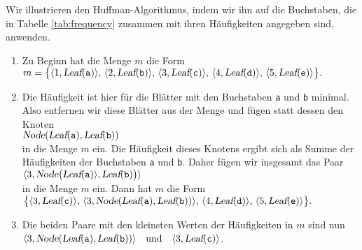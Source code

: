 Wir illustrieren den  Huffman-Algorithmus, indem wir ihn auf die Buchstaben, die in
Tabelle \ref{tab:frequency} zusammen mit ihren H\"aufigkeiten angegeben sind, anwenden.
\begin{enumerate}
\item Zu Beginn hat die Menge $m$ die Form
      \\[0.2cm]
      \hspace*{0.3cm}
      $ m = \bigl\{ \langle 1, \textsl{Leaf}(\mathtt{a}) \rangle,\,
             \langle 2, \textsl{Leaf}(\mathtt{b}) \rangle,\, 
             \langle 3, \textsl{Leaf}(\mathtt{c}) \rangle,\,
             \langle 4, \textsl{Leaf}(\mathtt{d}) \rangle,\,
             \langle 5, \textsl{Leaf}(\mathtt{e}) \rangle\bigr\}. $
\item Die H\"aufigkeit ist hier f\"ur die Bl\"atter mit den Buchstaben \texttt{a} und
      \texttt{b} minimal.  Also entfernen wir diese Bl\"atter aus der Menge und f\"ugen statt
      dessen den Knoten 
      \\[0.2cm]
      \hspace*{0.3cm}
      $\textsl{Node}(\textsl{Leaf}(\mathtt{a}), \textsl{Leaf}(\mathtt{b}))$
      \\[0.2cm]
      in die Menge $m$ ein.  Die H\"aufigkeit dieses Knotens ergibt sich als Summe der H\"aufigkeiten
      der Buchstaben \texttt{a} und \texttt{b}. Daher f\"ugen wir insgesamt das Paar
      \\[0.2cm]
      \hspace*{0.3cm}
      $\langle 3, \textsl{Node}\bigl(\textsl{Leaf}(\mathtt{a}) \rangle, \textsl{Leaf}(\mathtt{b}) \bigr) \rangle$
      \\[0.2cm]
      in die Menge $m$ ein.        Dann hat $m$ die Form
      \\[0.2cm]
      \hspace*{0.3cm}
      $ \bigl\{\langle 3, \textsl{Leaf}(\mathtt{c}) \rangle,\,
			\langle 3, \textsl{Node}(\textsl{Leaf}(\mathtt{a}), \textsl{Leaf}(\mathtt{b}))\rangle,\,
              \langle 4, \textsl{Leaf}(\mathtt{d}) \rangle,\,
             \langle 5, \textsl{Leaf}(\mathtt{e}) \rangle\bigr\}. $
\item Die beiden Paare mit den kleinsten Werten der H\"aufigkeiten in $m$ sind nun
      \\[0.2cm]
      \hspace*{0.3cm}
      $ \langle 3, \textsl{Node}(\textsl{Leaf}(\mathtt{a}), \textsl{Leaf}(\mathtt{b})) \rangle
         \quad \mathrm{und} \quad \langle 3, \textsl{Leaf}(\mathtt{c})\rangle$.
      \\[0.2cm]

\end{enumerate}
